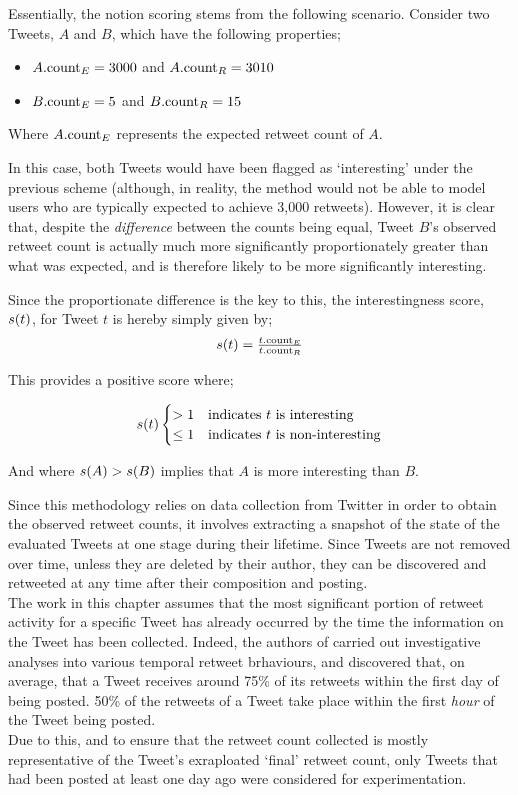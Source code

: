 Essentially, the notion scoring stems from the following scenario. Consider two Tweets, $A$ and $B$, which have the following properties;
\begin{itemize}
    \item $A.\textrm{count}_E = 3000$ and $A.\textrm{count}_R = 3010$
    \item $B.\textrm{count}_E = 5$ and $B.\textrm{count}_R = 15$
\end{itemize}
Where $A.\textrm{count}_E$ represents the expected retweet count of $A$.

In this case, both Tweets would have been flagged as `interesting' under the previous scheme (although, in reality, the method would not be able to model users who are typically expected to achieve 3,000 retweets). However, it is clear that, despite the \textit{difference} between the counts being equal, Tweet $B$'s observed retweet count is actually much more significantly proportionately greater than what was expected, and is therefore likely to be more significantly interesting.

Since the proportionate difference is the key to this, the interestingness score, $s(t)$, for Tweet $t$ is hereby simply given by;
\[
\begin{array}{cc}
 s(t) = \frac{t.\textrm{count}_E}{t.\textrm{count}_R}
\end{array}
\]

This provides a positive score where;

\[
s(t)
	\begin{cases}
		> 1		&	\text{indicates } t	\text{ is interesting} \\
		\leq 1	&	\text{indicates } t	\text{ is non-interesting}
  \end{cases}
\]

And where $s(A) > s(B)$ implies that $A$ is more interesting than $B$.

Since this methodology relies on data collection from Twitter in order to obtain the observed retweet counts, it involves extracting a snapshot of the state of the evaluated Tweets at one stage during their lifetime. Since Tweets are not removed over time, unless they are deleted by their author, they can be discovered and retweeted at any time after their composition and posting.\\
The work in this chapter assumes that the most significant portion of retweet activity for a specific Tweet has already occurred by the time the information on the Tweet has been collected. Indeed, the authors of \cite{kwak10} carried out investigative analyses into various temporal retweet brhaviours, and discovered that, on average, that a Tweet receives around 75\% of its retweets within the first day of being posted. 50\% of the retweets of a Tweet take place within the first \textit{hour} of the Tweet being posted.\\
Due to this, and to ensure that the retweet count collected is mostly representative of the Tweet's exraploated `final' retweet count, only Tweets that had been posted at least one day ago were considered for experimentation.


